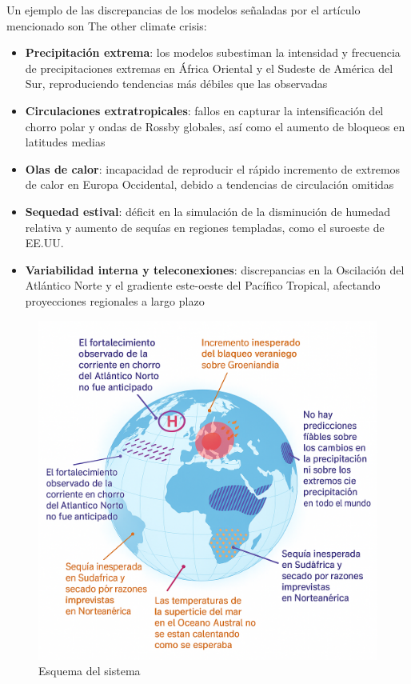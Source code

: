 \documentclass[
  10pt,
  a4paper,
  DIV=11,
  numbers=noendperiod,
  open=any]{scrreprt}
\providecommand{\tightlist}{%
  \setlength{\itemsep}{0pt}\setlength{\parskip}{0pt}}
\numberwithin{equation}{chapter}
\numberwithin{equation}{chapter}
\renewcommand{\[}{\begin{equation}}
\renewcommand{\]}{\end{equation}}
\begin{document}
Un ejemplo de las discrepancias de los modelos señaladas por el artículo
mencionado son The other climate crisis:

\begin{itemize}
\tightlist
\item
  \textbf{Precipitación extrema}: los modelos subestiman la intensidad y
  frecuencia de precipitaciones extremas en África Oriental y el Sudeste
  de América del Sur, reproduciendo tendencias más débiles que las
  observadas\\
\item
  \textbf{Circulaciones extratropicales}: fallos en capturar la
  intensificación del chorro polar y ondas de Rossby globales, así como
  el aumento de bloqueos en latitudes medias\\
\item
  \textbf{Olas de calor}: incapacidad de reproducir el rápido incremento
  de extremos de calor en Europa Occidental, debido a tendencias de
  circulación omitidas
\item
  \textbf{Sequedad estival}: déficit en la simulación de la disminución
  de humedad relativa y aumento de sequías en regiones templadas, como
  el suroeste de EE.UU.\\
\item
  \textbf{Variabilidad interna y teleconexiones}: discrepancias en la
  Oscilación del Atlántico Norte y el gradiente este-oeste del Pacífico
  Tropical, afectando proyecciones regionales a largo plazo
\end{itemize}

\begin{figure}

{\centering \includegraphics[width=0.6\linewidth,height=\textheight,keepaspectratio]{04-clima/fallos.png}

}

\caption{Esquema del sistema}

\end{figure}%
\end{document}
